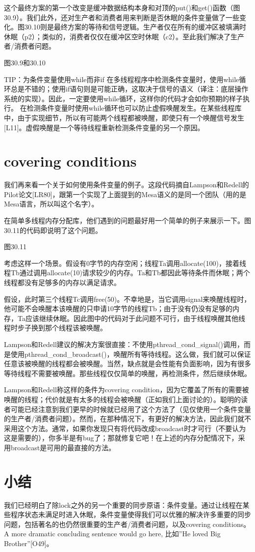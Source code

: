 这个最终方案的第一个改变是缓冲数据结构本身和对顶的put()和get()函数（图30.9）。我们此外，还对生产者和消费者用来判断是否休眠的条件变量做了一些变化。图30.10则是最终方案的等待和信号逻辑。生产者仅在所有的缓冲区被填满时休眠（p2）；类似的，消费者仅仅在缓冲区空时休眠（c2）。至此我们解决了生产者/消费者问题。

图30.9和30.10

TIP：为条件变量使用while而非if
在多线程程序中检测条件变量时，使用while循环总是不错的；使用if语句则是可能正确，这取决于信号的语义（译注：底层操作系统的实现）。因此，一定要使用while循环，这样你的代码才会如你预期的样子执行。
在检测条件变量时使用while循环也可以防止虚假唤醒发生。在某些线程库中，由于实现细节，所以有可能两个线程都被唤醒，即使只有一个唤醒信号发生[L11]。虚假唤醒是一个等待线程重新检测条件变量的另一个原因。


\section{covering conditions}
我们再来看一个关于如何使用条件变量的例子。这段代码摘自Lampson和Redell的Pilot论文[LR80]，跟第一个实现了上面提到的Mesa语义的是同一个团队（用的是Mesa语言，所以叫这个名字）。

在简单多线程内存分配库，他们遇到的问题最好用一个简单的例子来展示一下。图30.11的代码即说明了这个问题。

图30.11

考虑这样一个场景。假设有0字节的内存空闲；线程Ta调用allocate(100)，接着线程Tb通过调用allocate(10)请求较少的内存。Ta和Tb都因此等待条件而休眠；两个线程都没有足够多的内存以满足请求。

假设，此时第三个线程Tc调用free(50)。不幸地是，当它调用signal来唤醒线程时，他可能不会唤醒本该唤醒的只申请10字节的线程Tb；由于没有仍没有足够的内存，Ta应该继续休眠。因此图中的代码对于此问题不可行，由于线程唤醒其他线程时步子换到那个线程该被唤醒。

Lampson和Redell建议的解决方案很直接：不使用pthread\_cond\_signal()调用，而是使用pthread\_cond\_broadcast()，唤醒所有等待线程。这么做，我们就可以保证任意该被唤醒的线程都会被唤醒。当然，缺点就是会性能有负面影响，因为有很多等待线程不需要被唤醒。那些线程仅仅简单的唤醒，再检测条件，然后继续休眠。

Lampson和Redell称这样的条件为covering condition，因为它覆盖了所有的需要被唤醒的线程；代价就是有太多的线程会被唤醒（正如我们上面讨论的）。聪明的读者可能已经注意到我们更早的时候就已经用了这个方法了（见仅使用一个条件变量的生产者/消费者问题）。然而，在那种情况下，有更好的解决方法，因此我们就不采用这个方法。通常，如果你发现只有将代码改成broadcast时才可行（不要认为这是需要的），你多半是有bug了；那就修复它吧！在上述的内存分配情况下，采用broadcast是可用的最直接的方法。


\section{小结}
我们已经明白了除lock之外的另一个重要的同步原语：条件变量。通过让线程在某些程序状态未满足时进入休眠，条件变量使得我们可以优雅的解决许多重要的同步问题，包括著名的也仍然很重要的生产者/消费者问题，以及covering conditions。A more dramatic concluding sentence would go here, 比如”He loved Big Brother”[O49]。


